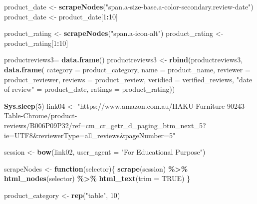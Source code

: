 \documentclass[
]{article}
\newenvironment{Shaded}{\begin{snugshade}}{\end{snugshade}}
\newcommand{\AttributeTok}[1]{\textcolor[rgb]{0.13,0.29,0.53}{#1}}
\newcommand{\ConstantTok}[1]{\textcolor[rgb]{0.56,0.35,0.01}{#1}}
\newcommand{\ControlFlowTok}[1]{\textcolor[rgb]{0.13,0.29,0.53}{\textbf{#1}}}
\newcommand{\DecValTok}[1]{\textcolor[rgb]{0.00,0.00,0.81}{#1}}
\newcommand{\FunctionTok}[1]{\textcolor[rgb]{0.13,0.29,0.53}{\textbf{#1}}}
\newcommand{\NormalTok}[1]{#1}
\newcommand{\OtherTok}[1]{\textcolor[rgb]{0.56,0.35,0.01}{#1}}
\newcommand{\SpecialCharTok}[1]{\textcolor[rgb]{0.81,0.36,0.00}{\textbf{#1}}}
\newcommand{\StringTok}[1]{\textcolor[rgb]{0.31,0.60,0.02}{#1}}
\begin{document}
\begin{Shaded}
\begin{Highlighting}[]
\NormalTok{  product\_date }\OtherTok{\textless{}{-}} \FunctionTok{scrapeNodes}\NormalTok{(}\StringTok{"span.a{-}size{-}base.a{-}color{-}secondary.review{-}date"}\NormalTok{)}
\NormalTok{  product\_date }\OtherTok{\textless{}{-}}\NormalTok{ product\_date[}\DecValTok{1}\SpecialCharTok{:}\DecValTok{10}\NormalTok{]}
  
\NormalTok{  product\_rating }\OtherTok{\textless{}{-}} \FunctionTok{scrapeNodes}\NormalTok{(}\StringTok{"span.a{-}icon{-}alt"}\NormalTok{)}
\NormalTok{  product\_rating }\OtherTok{\textless{}{-}}\NormalTok{ product\_rating[}\DecValTok{1}\SpecialCharTok{:}\DecValTok{10}\NormalTok{]}
  
\NormalTok{  productreviews3}\OtherTok{=} \FunctionTok{data.frame}\NormalTok{()}
\NormalTok{  productreviews3 }\OtherTok{\textless{}{-}} \FunctionTok{rbind}\NormalTok{(productreviews3, }\FunctionTok{data.frame}\NormalTok{(}
                      \AttributeTok{category =}\NormalTok{ product\_category,}
                      \AttributeTok{name =}\NormalTok{ product\_name,}
                      \AttributeTok{reviewer =}\NormalTok{ product\_reviewer,}
                      \AttributeTok{reviews =}\NormalTok{ product\_review,}
                      \AttributeTok{veridied =}\NormalTok{ verified\_reviews,}
                      \StringTok{"date of review"} \OtherTok{=}\NormalTok{ product\_date,}
                      \AttributeTok{ratings =}\NormalTok{ product\_rating))}
  
   \FunctionTok{Sys.sleep}\NormalTok{(}\DecValTok{5}\NormalTok{)}
\NormalTok{link04 }\OtherTok{\textless{}{-}} \StringTok{"https://www.amazon.com.au/HAKU{-}Furniture{-}90243{-}Table{-}Chrome/product{-}reviews/B006P09P32/ref=cm\_cr\_getr\_d\_paging\_btm\_next\_5?ie=UTF8\&reviewerType=all\_reviews\&pageNumber=5"}


\NormalTok{  session }\OtherTok{\textless{}{-}} \FunctionTok{bow}\NormalTok{(link02,}
               \AttributeTok{user\_agent =} \StringTok{"For Educational Purpose"}\NormalTok{)}

\NormalTok{  scrapeNodes }\OtherTok{\textless{}{-}} \ControlFlowTok{function}\NormalTok{(selector)\{}
    \FunctionTok{scrape}\NormalTok{(session) }\SpecialCharTok{\%\textgreater{}\%}
      \FunctionTok{html\_nodes}\NormalTok{(selector) }\SpecialCharTok{\%\textgreater{}\%}
      \FunctionTok{html\_text}\NormalTok{(}\AttributeTok{trim =} \ConstantTok{TRUE}\NormalTok{)}
\NormalTok{  \}}

\NormalTok{  product\_category }\OtherTok{\textless{}{-}} \FunctionTok{rep}\NormalTok{(}\StringTok{"table"}\NormalTok{, }\DecValTok{10}\NormalTok{)}


\end{Highlighting}
\end{Shaded}
\end{document}
